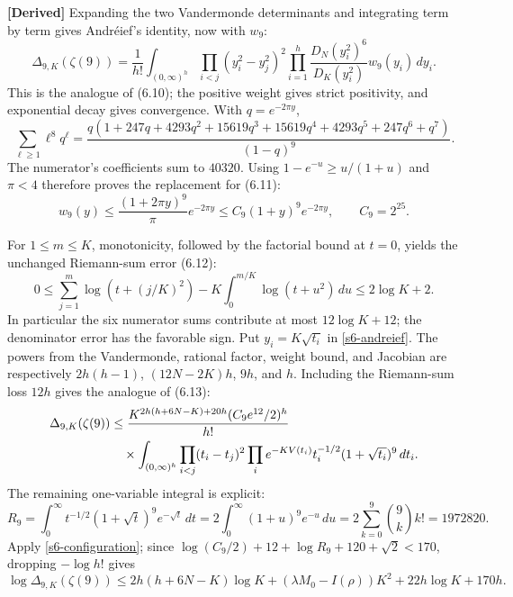 \textbf{[Derived]} Expanding the two Vandermonde determinants and
integrating term by term gives Andr\'eief's identity, now with $w_9$:
\begin{equation}
 \Delta_{9,K}(\zeta(9))=\frac1{h!}\int_{(0,\infty)^h}
 \prod_{i<j}(y_i^2-y_j^2)^2
 \prod_{i=1}^h\frac{D_N(y_i^2)^6}{D_K(y_i^2)}w_9(y_i)\,dy_i.
 \label{s6-andreief}
\end{equation}
This is the analogue of (6.10); the positive weight gives strict
positivity, and exponential decay gives convergence.  With $q=e^{-2\pi y}$,
\[
 \sum_{\ell\ge1}\ell^8q^\ell
 =\frac{q(1+247q+4293q^2+15619q^3+15619q^4
                         +4293q^5+247q^6+q^7)}{(1-q)^9}.
\]
The numerator's coefficients sum to $40320$.  Using
$1-e^{-u}\ge u/(1+u)$ and $\pi<4$ therefore proves the replacement
for (6.11):
\begin{equation}
 w_9(y)\le\frac{(1+2\pi y)^9}{\pi}e^{-2\pi y}
          \le C_9(1+y)^9e^{-2\pi y},\qquad C_9=2^{25}.
 \label{s6-weight-bound}
\end{equation}

For $1\le m\le K$, monotonicity, followed by the factorial bound at
$t=0$, yields the unchanged Riemann-sum error (6.12):
\begin{equation}
 0\le\sum_{j=1}^m\log(t+(j/K)^2)
       -K\int_0^{m/K}\log(t+u^2)\,du\le2\log K+2.
 \label{s6-riemann}
\end{equation}
In particular the six numerator sums contribute at most $12\log K+12$;
the denominator error has the favorable sign.  Put $y_i=K\sqrt{t_i}$
in \eqref{s6-andreief}.  The powers from the Vandermonde, rational
factor, weight bound, and Jacobian are respectively
$2h(h-1)$, $(12N-2K)h$, $9h$, and $h$.  Including the Riemann-sum
loss $12h$ gives the analogue of (6.13):
\begin{align}
 \Delta_{9,K}(\zeta(9))&\le
 \frac{K^{2h(h+6N-K)+20h}(C_9e^{12}/2)^h}{h!}\notag\\
 &\quad\times\int_{(0,\infty)^h}\prod_{i<j}(t_i-t_j)^2
       \prod_i e^{-KV(t_i)}t_i^{-1/2}(1+\sqrt{t_i})^9\,dt_i.
 \label{s6-scaled}
\end{align}
The remaining one-variable integral is explicit:
\[
 R_9=\int_0^\infty t^{-1/2}(1+\sqrt t)^9e^{-\sqrt t}\,dt
     =2\int_0^\infty(1+u)^9e^{-u}\,du
     =2\sum_{k=0}^9\binom9k k!=1972820.
\]
Apply \eqref{s6-configuration}; since
$\log(C_9/2)+12+\log R_9+120+\sqrt2<170$, dropping $-\log h!$
gives
\begin{equation}
 \log\Delta_{9,K}(\zeta(9))\le
 2h(h+6N-K)\log K+(\lambda M_0-I(\rho))K^2
                 +22h\log K+170h.
 \label{s6-delta-bound}
\end{equation}

